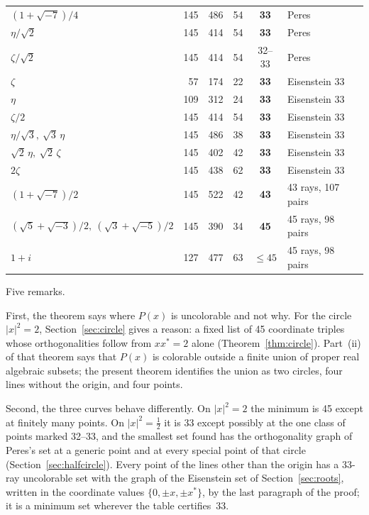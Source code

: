 \begin{table}[t]
\begin{tabular}{@{}lrrrcl@{}}
$(1+\sqrt{-7})/4$ & 145 & 486 & 54 & \textbf{33} & Peres \\
$\eta/\sqrt2$ & 145 & 414 & 54 & \textbf{33} & Peres \\
$\zeta/\sqrt2$ & 145 & 414 & 54 & 32--33 & Peres \\
$\zeta$ & 57 & 174 & 22 & \textbf{33} & Eisenstein 33 \\
$\eta$ & 109 & 312 & 24 & \textbf{33} & Eisenstein 33 \\
$\zeta/2$ & 145 & 414 & 54 & \textbf{33} & Eisenstein 33 \\
$\eta/\sqrt3,\ \sqrt3\,\eta$ & 145 & 486 & 38 & \textbf{33} & Eisenstein 33 \\
$\sqrt2\,\eta,\ \sqrt2\,\zeta$ & 145 & 402 & 42 & \textbf{33} & Eisenstein 33 \\
$2\zeta$ & 145 & 438 & 62 & \textbf{33} & Eisenstein 33 \\
$(1+\sqrt{-7})/2$ & 145 & 522 & 42 & \textbf{43} & 43 rays, 107 pairs \\
$(\sqrt5+\sqrt{-3})/2,\ (\sqrt3+\sqrt{-5})/2$ & 145 & 390 & 34 & \textbf{45} & 45 rays, 98 pairs \\
$1+i$ & 127 & 477 & 63 & $\le45$ & 45 rays, 98 pairs \\
\bottomrule
\end{tabular}
\end{table}

Five remarks.

First, the theorem says where $P(x)$ is uncolorable and not why.  For the circle $|x|^2=2$,
Section~\ref{sec:circle} gives a reason: a fixed list of 45 coordinate triples whose orthogonalities follow
from $xx^{*}=2$ alone (Theorem~\ref{thm:circle}).  Part~(ii) of that theorem says that $P(x)$ is
colorable outside a finite union of proper real algebraic subsets; the present theorem
identifies the union as two circles, four lines without the origin, and four points.

Second, the three curves behave differently.  On $|x|^2=2$ the minimum is 45 except at
finitely many points.  On $|x|^2=\tfrac12$ it is 33 except possibly at the one class of
points marked 32--33, and the smallest set found has the orthogonality graph of Peres's set at
a generic point and at every special point of that circle (Section~\ref{sec:halfcircle}).
Every point of the lines other than the origin has a
33-ray uncolorable set with the graph of the Eisenstein set of Section~\ref{sec:roots}, written
in the coordinate values $\{0,\pm x,\pm x^{*}\}$, by the last paragraph of the proof; it is a minimum set
wherever the table certifies~33.

